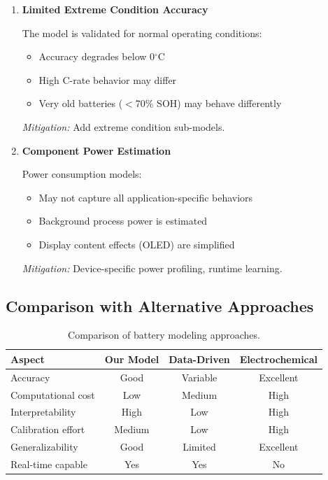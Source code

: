 \begin{enumerate}
    \textit{Mitigation:} Incorporate usage prediction models, provide range estimates.
    
    \item \textbf{Limited Extreme Condition Accuracy}
    
    The model is validated for normal operating conditions:
    \begin{itemize}
        \item Accuracy degrades below 0$^\circ$C
        \item High C-rate behavior may differ
        \item Very old batteries ($<$70\% SOH) may behave differently
    \end{itemize}
    
    \textit{Mitigation:} Add extreme condition sub-models.
    
    \item \textbf{Component Power Estimation}
    
    Power consumption models:
    \begin{itemize}
        \item May not capture all application-specific behaviors
        \item Background process power is estimated
        \item Display content effects (OLED) are simplified
    \end{itemize}
    
    \textit{Mitigation:} Device-specific power profiling, runtime learning.
\end{enumerate}

\subsection{Comparison with Alternative Approaches}
\label{subsec:comparison}

\begin{table}[H]
    \centering
    \caption{Comparison of battery modeling approaches.}
    \label{tab:comparison}
    \begin{tabular}{lccc}
        \toprule
        \textbf{Aspect} & \textbf{Our Model} & \textbf{Data-Driven} & \textbf{Electrochemical} \\
        \midrule
        Accuracy & Good & Variable & Excellent \\
        Computational cost & Low & Medium & High \\
        Interpretability & High & Low & High \\
        Calibration effort & Medium & Low & High \\
        Generalizability & Good & Limited & Excellent \\
        Real-time capable & Yes & Yes & No \\
        \bottomrule
    \end{tabular}
\end{table}

